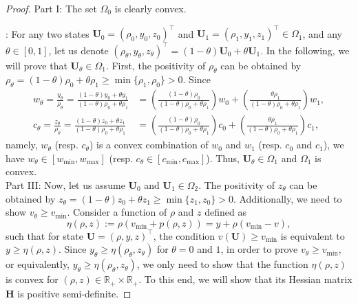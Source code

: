 \documentclass[times,final]{elsarticle}
\numberwithin{equation}{section}
\theoremstyle{definition}
\theoremstyle{remark}
\newcommand{\BU}{\mathbf{U}}
\begin{document}
\begin{proof}
	{\sf Part I}: 
	The set $\Omega_0$ is clearly convex.
	
	: 
	For any two states $\BU_0 = (\rho_0,y_0,z_0)^\top$ and $\BU_1 = (\rho_1,y_1,z_1)^\top \in \Omega_1$, and any $\theta \in [0,1]$, let us denote $ (\rho_\theta, y_\theta, z_\theta)^\top = (1 - \theta) \BU_0 + \theta \BU_1$. In the following, we will prove that $\BU_\theta \in \Omega_1$. 
	First, the positivity of $\rho_\theta$ can be obtained by
	$\rho_\theta = (1 - \theta) \rho_0 + \theta \rho_1 \ge \min\{\rho_1,\rho_0\} > 0$.
	Since
	\begin{align*}
		w_\theta
		=
		\frac{y_\theta}{\rho_\theta}
		=
		\frac
		{(1 - \theta) y_0 + \theta y_1}
		{(1 - \theta) \rho_0 + \theta \rho_1}
		&
		=
		\left(
		\frac{(1 - \theta) \rho_0}{(1 - \theta) \rho_0 + \theta \rho_1}
		\right)
		w_0
		+
		\left(
		\frac
		{\theta \rho_1}
		{(1 - \theta) \rho_0 + \theta \rho_1}
		\right)
		w_1,
		\\
		c_\theta
		=
		\frac{z_\theta}{\rho_\theta}
		=
		\frac
		{(1 - \theta) z_0 + \theta z_1}
		{(1 - \theta) \rho_0 + \theta \rho_1}
		& 
		=
		\left(
		\frac{(1 - \theta) \rho_0}{(1 - \theta) \rho_0 + \theta \rho_1}
		\right)
		c_0
		+
		\left(
		\frac
		{\theta \rho_1}
		{(1 - \theta) \rho_0 + \theta \rho_1}
		\right)
		c_1,
	\end{align*}
	namely, $w_\theta$ (resp. $c_\theta$) is a convex combination of $w_0$ and $w_1$ (resp. $c_0$ and $c_1$), we have $w_\theta \in [w_{\min},w_{\max}]$ (resp. $c_\theta \in [c_{\min},c_{\max}]$). Thus, $\BU_\theta \in \Omega_1$ and $\Omega_1$ is convex. \\
	{\sf Part III}: Now, let us assume $\BU_0$ and $\BU_1 \in \Omega_2$. The positivity of $z_\theta$ can be obtained by 
	$z_\theta = (1 - \theta) z_0 + \theta z_1 \ge \min\{z_1,z_0\} > 0$.
	Additionally, we need to show $v_\theta \ge v_{\min}$.
	Consider a function of $\rho$ and $z$ defined as
	\begin{equation}\label{eq:406}
		\eta(\rho,z)
		:=
		\rho (v_{\min} + p(\rho, z))
		=
		y+\rho(v_{\min}-v)
		,
	\end{equation}
	such that for state $\BU = (\rho,y,z)^\top$, the condition $v(\BU) \ge v_{\min}$ is equivalent to $y \ge \eta(\rho,z)$. Since $y_\theta \ge \eta(\rho_\theta,z_\theta)$ for $\theta = 0$ and $1$, in order to prove $v_\theta \ge v_{\min}$, or equivalently, $y_\theta \ge \eta(\rho_\theta,z_\theta)$, we only need to show that the function $\eta(\rho,z)$ is convex for $(\rho,z) \in \mathbb{R}_+ \times \mathbb{R}_+$. To this end, we will show that its Hessian matrix $\mathbf{H}$ is positive semi-definite.

\end{proof}
\end{document}
